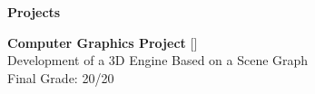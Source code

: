 \noindent\textbf{Projects}
\noindent\hrulefill
\vspace{0.25em}
\begin{adjustwidth}{1.5em}{0em}
\textbf{Computer Graphics Project} \hfill [\href{https://github.com/a104437ana/CG}{\faGithub}] \\
Development of a 3D Engine Based on a Scene Graph\\
Final Grade: 20/20
\end{adjustwidth}
\vspace{0.25em}